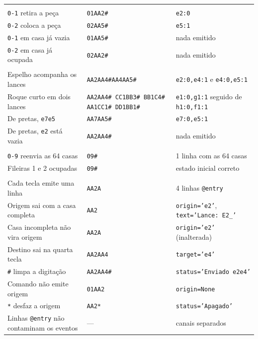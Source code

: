 \documentclass[12pt,a4paper]{article}
\begin{document}
\begin{longtable}{@{}L{0.32\textwidth}L{0.28\textwidth}L{0.32\textwidth}@{}}
\addlinespace
{} \\[2pt]
\texttt{0-1} retira a peça & \texttt{01AA2\#} & \texttt{e2:0} \\
\texttt{0-2} coloca a peça & \texttt{02AA5\#} & \texttt{e5:1} \\
\texttt{0-1} em casa já vazia & \texttt{01AA5\#} & nada emitido \\
\texttt{0-2} em casa já ocupada & \texttt{02AA2\#} & nada emitido \\
\addlinespace
{} \\[2pt]
Espelho acompanha os lances & \texttt{AA2AA4\#AA4AA5\#} & \texttt{e2:0,e4:1} e \texttt{e4:0,e5:1} \\
Roque curto em dois lances & \texttt{AA2AA4\# CC1BB3\# BB1C4\# AA1CC1\# DD1BB1\#} & \texttt{e1:0,g1:1} seguido de \texttt{h1:0,f1:1} \\
De pretas, \texttt{e7e5} & \texttt{AA7AA5\#} & \texttt{e7:0,e5:1} \\
De pretas, \texttt{e2} está vazia & \texttt{AA2AA4\#} & nada emitido \\
\addlinespace
{} \\[2pt]
\texttt{0-9} reenvia as 64 casas & \texttt{09\#} & 1 linha com as 64 casas \\
Fileiras 1 e 2 ocupadas & \texttt{09\#} & estado inicial correto \\
\addlinespace
{} \\[2pt]
Cada tecla emite uma linha & \texttt{AA2A} & 4 linhas \texttt{@entry} \\
Origem sai com a casa completa & \texttt{AA2} & \texttt{origin='e2'}, \texttt{text='Lance: E2\_'} \\
Casa incompleta não vira origem & \texttt{AA2A} & \texttt{origin='e2'} (inalterada) \\
Destino sai na quarta tecla & \texttt{AA2AA4} & \texttt{target='e4'} \\
\texttt{\#} limpa a digitação & \texttt{AA2AA4\#} & \texttt{status='Enviado e2e4'} \\
Comando não emite origem & \texttt{01AA2} & \texttt{origin=None} \\
\texttt{*} desfaz a origem & \texttt{AA2*} & \texttt{status='Apagado'} \\
Linhas \texttt{@entry} não contaminam os eventos & --- & canais separados \\
\bottomrule
\end{longtable}
\end{document}
